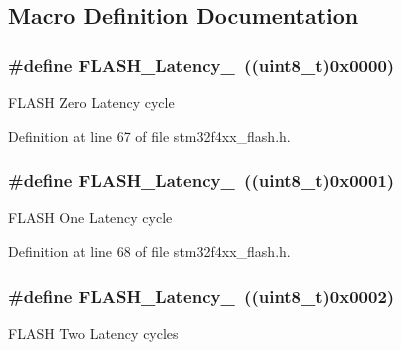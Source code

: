 \subsection{Macro Definition Documentation}
\hypertarget{group___flash___latency_ga09afe6e52b819cc074f6111ec42ac3c3}{
\subsubsection[{F\-L\-A\-S\-H\-\_\-\-Latency\-\_\-0}]{\setlength{\rightskip}{0pt plus 5cm}\#define F\-L\-A\-S\-H\-\_\-\-Latency\-\_~((uint8\-\_\-t)0x0000)}}\label{group___flash___latency_ga09afe6e52b819cc074f6111ec42ac3c3}
F\-L\-A\-S\-H Zero Latency cycle 

Definition at line 67 of file stm32f4xx\-\_\-flash.\-h.

\hypertarget{group___flash___latency_ga6b7281665340fe8f7919bdfcfd06f8e6}{
\subsubsection[{F\-L\-A\-S\-H\-\_\-\-Latency\-\_\-1}]{\setlength{\rightskip}{0pt plus 5cm}\#define F\-L\-A\-S\-H\-\_\-\-Latency\-\_~((uint8\-\_\-t)0x0001)}}\label{group___flash___latency_ga6b7281665340fe8f7919bdfcfd06f8e6}
F\-L\-A\-S\-H One Latency cycle 

Definition at line 68 of file stm32f4xx\-\_\-flash.\-h.

\hypertarget{group___flash___latency_ga55173ebb5c978459ce18d5e2516e3e89}{
\subsubsection[{F\-L\-A\-S\-H\-\_\-\-Latency\-\_\-2}]{\setlength{\rightskip}{0pt plus 5cm}\#define F\-L\-A\-S\-H\-\_\-\-Latency\-\_~((uint8\-\_\-t)0x0002)}}\label{group___flash___latency_ga55173ebb5c978459ce18d5e2516e3e89}
F\-L\-A\-S\-H Two Latency cycles 

